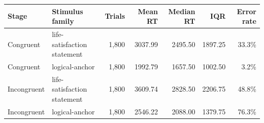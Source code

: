 \begin{tabular}{@{}llrrrrr@{}}
\toprule
Stage & Stimulus family & Trials & Mean RT & Median RT & IQR & Error rate \\
\midrule
Congruent & life-satisfaction statement & 1,800 & 3037.99 & 2495.50 & 1897.25 & 33.3\% \\
Congruent & logical-anchor & 1,800 & 1992.79 & 1657.50 & 1002.50 & 3.2\% \\
Incongruent & life-satisfaction statement & 1,800 & 3609.74 & 2828.50 & 2206.75 & 48.8\% \\
Incongruent & logical-anchor & 1,800 & 2546.22 & 2088.00 & 1379.75 & 76.3\% \\
\bottomrule
\end{tabular}